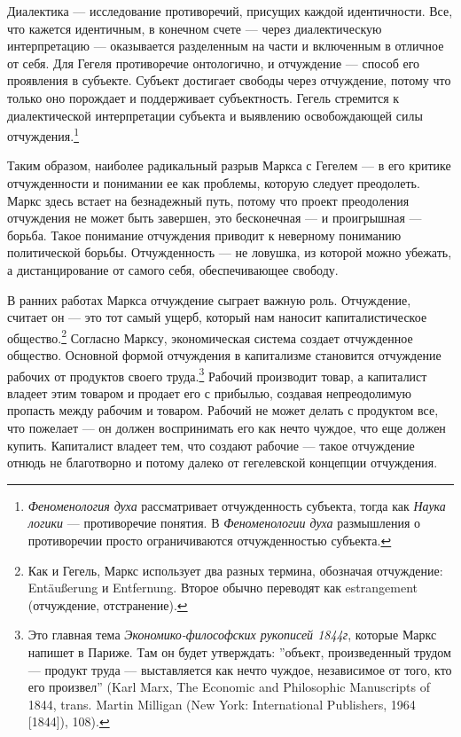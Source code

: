 \documentclass[12pt]{book}
\begin{document}
Диалектика --- исследование противоречий, присущих каждой идентичности. Все, что кажется идентичным, в конечном счете --- через диалектическую интерпретацию --- оказывается разделенным на части и включенным в отличное от себя. Для Гегеля противоречие онтологично, и отчуждение --- способ его проявления в субъекте. Субъект достигает свободы через отчуждение, потому что только оно порождает и поддерживает субъектность. Гегель стремится к диалектической интерпретации субъекта и выявлению освобождающей силы отчуждения.\footnote{\textit{Феноменология духа} рассматривает отчужденность субъекта, тогда как \textit{Наука логики} --- противоречие понятия. В \textit{Феноменологии духа} размышления о противоречии просто ограничиваются отчужденностью субъекта.}

Таким образом, наиболее радикальный разрыв Маркса с Гегелем --- в его критике отчужденности и понимании ее как проблемы, которую следует преодолеть. Маркс здесь встает на безнадежный путь, потому что проект преодоления отчуждения не может быть завершен, это бесконечная --- и проигрышная --- борьба. Такое понимание отчуждения приводит к неверному пониманию политической борьбы. Отчужденность --- не ловушка, из которой можно убежать, а дистанцирование от самого себя, обеспечивающее свободу.

В ранних работах Маркса отчуждение сыграет важную роль. Отчуждение, считает он --- это тот самый ущерб, который нам наносит капиталистическое общество.\footnote{Как и Гегель, Маркс использует два разных термина, обозначая отчуждение: Entäußerung и Entfernung. Второе обычно переводят как estrangement (отчуждение, отстранение).} Согласно Марксу, экономическая система создает отчужденное общество. Основной формой отчуждения в капитализме становится отчуждение рабочих от продуктов своего труда.\footnote{Это главная тема \textit{Экономико-философских рукописей 1844г}, которые Маркс напишет в Париже. Там он будет утверждать: ''объект, произведенный трудом --- продукт труда --- выставляется как нечто чуждое, независимое от того, кто его произвел'' (Karl Marx, The Economic and Philosophic Manuscripts of 1844, trans. Martin Milligan (New York: International Publishers, 1964 [1844]), 108).} Рабочий производит товар, а капиталист владеет этим товаром и продает его с прибылью, создавая непреодолимую пропасть между рабочим и товаром. Рабочий не может делать с продуктом все, что пожелает --- он должен воспринимать его как нечто чуждое, что еще должен купить. Капиталист владеет тем, что создают рабочие --- такое отчуждение отнюдь не благотворно и потому далеко от гегелевской концепции отчуждения.
\end{document}
